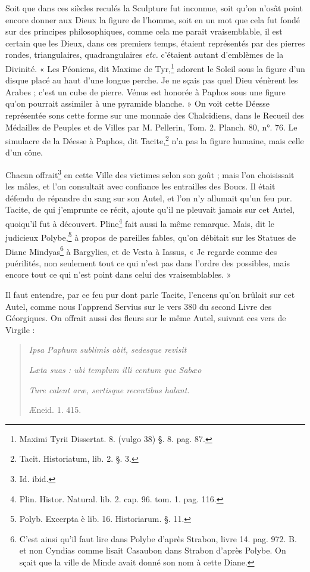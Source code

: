\documentclass[a4paper, 11pt, oneside, polutonikogreek, french]{article}
\begin{document}
Soit que dans ces siècles reculés la Sculpture fut inconnue, soit qu'on n'osât point encore donner aux Dieux la figure de l'homme, soit en un mot que cela fut fondé sur des principes philosophiques, comme cela me parait vraisemblable, il est certain que les Dieux, dans ces premiers temps, étaient représentés par des pierres rondes, triangulaires, quadrangulaires \emph{etc.} c'étaient autant d'emblèmes de la Divinité. « Les Péoniens, dit Maxime de Tyr,\footnote{Maximi Tyrii Dissertat. 8. (vulgo 38) §. 8. pag. 87.} adorent le Soleil sous la figure d'un disque placé au haut d'une longue perche. Je ne sçais pas quel Dieu vénèrent les Arabes ; c'est un cube de pierre. Vénus est honorée à Paphos sous une figure qu'on pourrait assimiler à une pyramide blanche. » On voit cette Déesse représentée sons cette forme sur une monnaie des Chalcidiens, dans le Recueil des Médailles de Peuples et de Villes par M. Pellerin, Tom. 2. Planch. 80, n°. 76. Le simulacre de la Déesse à Paphos, dit Tacite,\footnote{Tacit. Historiatum, lib. 2. §. 3.} n'a pas la figure humaine, mais celle d'un cône.

Chacun offrait\footnote{Id. ibid.} en cette Ville des victimes selon son goût ; mais l'on choisissait les mâles, et l'on consultait avec confiance les entrailles des Boucs. Il était défendu de répandre du sang sur son Autel, et l'on n'y allumait qu'un feu pur. Tacite, de qui j'emprunte ce récit, ajoute qu'il ne pleuvait jamais sur cet Autel, quoiqu'il fut à découvert. Pline\footnote{Plin. Histor. Natural. lib. 2. cap. 96. tom. 1. pag. 116.} fait aussi la même remarque. Mais, dit le judicieux Polybe,\footnote{Polyb. Excerpta è lib. 16. Historiarum. §. 11.} à propos de pareilles fables, qu'on débitait sur les Statues de Diane Mindyas\footnote{C'est ainsi qu'il faut lire dans Polybe d'après Strabon, livre 14. pag. 972. B. et non Cyndias comme lisait Casaubon dans Strabon d'après Polybe. On sçait que la ville de Minde avait donné son nom à cette Diane.} à Bargylies, et de Vesta à Iassus, « Je regarde comme des puérilités, non seulement tout ce qui n'est pas dans l'ordre des possibles, mais encore tout ce qui n'est point dans celui des vraisemblables. »

Il faut entendre, par ce feu pur dont parle Tacite, l'encens qu'on brûlait sur cet Autel, comme nous l'apprend Servius sur le vers 380 du second Livre des Géorgiques. On offrait aussi des fleurs sur le même Autel, suivant ces vers de Virgile :
\begin{quotation}
\emph{Ipsa Paphum sublimis abit, sedesque revisit}

\emph{Læta suas : ubi templum illi centum que Sabæo}

\emph{Ture calent aræ, sertisque recentibus halant.}

\hspace*{35mm}Æneid. 1. 415.
\end{quotation}
\end{document}
